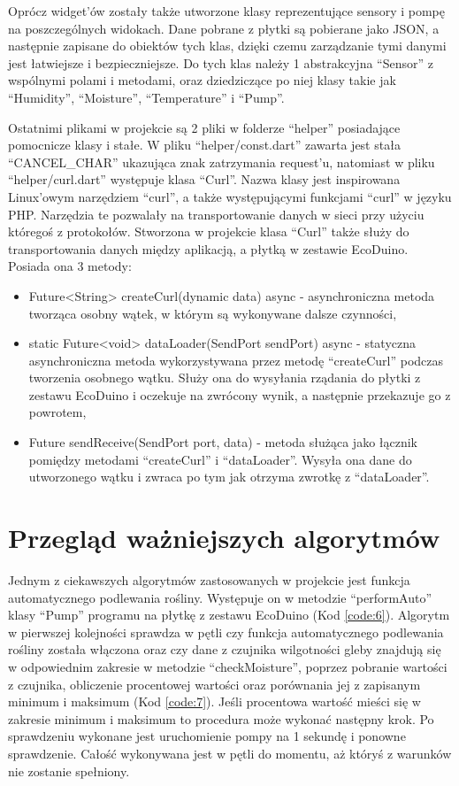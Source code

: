 \documentclass[a4paper,twoside,12pt]{book}
\begin{document}
Oprócz widget'ów zostały także utworzone klasy reprezentujące sensory i pompę na poszczególnych widokach. Dane pobrane z płytki są pobierane jako JSON, a następnie zapisane do obiektów tych klas, dzięki czemu zarządzanie tymi danymi jest łatwiejsze i bezpieczniejsze. Do tych klas należy 1 abstrakcyjna ``Sensor'' z wspólnymi polami i metodami, oraz dziedziczące po niej klasy takie jak ``Humidity'', ``Moisture'', ``Temperature'' i ``Pump''.

Ostatnimi plikami w projekcie są 2 pliki w folderze ``helper'' posiadające pomocnicze klasy i stałe. W pliku ``helper/const.dart'' zawarta jest stała ``CANCEL\_CHAR'' ukazująca znak zatrzymania request'u, natomiast w pliku ``helper/curl.dart'' występuje klasa ``Curl''. Nazwa klasy jest inspirowana Linux'owym narzędziem ``curl'', a także występującymi funkcjami ``curl'' w języku PHP. Narzędzia te pozwalały na transportowanie danych w sieci przy użyciu któregoś z protokołów. Stworzona w projekcie klasa ``Curl'' także służy do transportowania danych między aplikacją, a płytką w zestawie EcoDuino. Posiada ona 3 metody:

\begin{itemize}
   \item Future<String> createCurl(dynamic data) async - asynchroniczna metoda tworząca osobny wątek, w którym są wykonywane dalsze czynności,
   \item static Future<void> dataLoader(SendPort sendPort) async - statyczna asynchroniczna metoda wykorzystywana przez metodę ``createCurl'' podczas tworzenia osobnego wątku. Służy ona do wysyłania rządania do płytki z zestawu EcoDuino i oczekuje na zwrócony wynik, a następnie przekazuje go z powrotem,
   \item Future sendReceive(SendPort port, data) - metoda służąca jako łącznik pomiędzy metodami ``createCurl'' i ``dataLoader''. Wysyła ona dane do utworzonego wątku i zwraca po tym jak otrzyma zwrotkę z ``dataLoader''.
\end{itemize}

\section{Przegląd ważniejszych algorytmów}

Jednym z ciekawszych algorytmów zastosowanych w projekcie jest funkcja automatycznego podlewania rośliny. Występuje on w metodzie ``performAuto'' klasy ``Pump'' programu na płytkę z zestawu EcoDuino (Kod \ref{code:6}). Algorytm w pierwszej kolejności sprawdza w pętli czy funkcja automatycznego podlewania rośliny została włączona oraz czy dane z czujnika wilgotności gleby znajdują się w odpowiednim zakresie w metodzie ``checkMoisture'', poprzez pobranie wartości z czujnika, obliczenie procentowej wartości oraz porównania jej z zapisanym minimum i maksimum (Kod \ref{code:7}). Jeśli procentowa wartość mieści się w zakresie minimum i maksimum to procedura może wykonać następny krok. Po sprawdzeniu wykonane jest uruchomienie pompy na 1 sekundę i ponowne sprawdzenie. Całość wykonywana jest w pętli do momentu, aż któryś z warunków nie zostanie spełniony.
\end{document}
